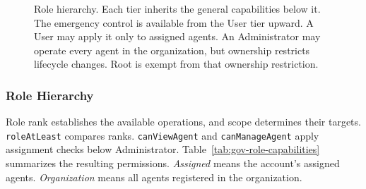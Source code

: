 \begin{figure}[htbp]
\centering
{}
\caption{Role hierarchy. Each tier inherits the general capabilities below it.
The emergency control is available from the User tier upward. A User may apply
it only to assigned agents. An Administrator may operate every agent in the
organization, but ownership restricts lifecycle changes. Root is exempt from
that ownership restriction.}
\label{fig:gov-rbac}
\end{figure}

\FloatBarrier
\subsubsection{Role Hierarchy}
\label{sec:gov-role-hierarchy}

{\color{red}Role rank establishes the available operations, and scope determines their
targets. \texttt{roleAtLeast} compares ranks. \texttt{canViewAgent} and
\texttt{canManageAgent} apply assignment checks below Administrator.
Table~\ref{tab:gov-role-capabilities} summarizes the resulting permissions.
\textit{Assigned} means the account's assigned agents. \textit{Organization}
means all agents registered in the organization.}

